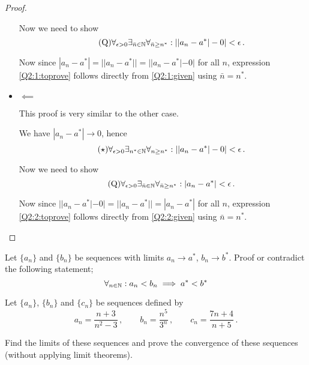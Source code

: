 \documentclass[week=2]{homework}
\begin{document}
\begin{questions}
\begin{proof}
\begin{itemize}
	    		Now we need to show
	    		\begin{equation} \label{Q2:1:toprove} \tag{Q}
		    		\forall_{\epsilon > 0}\exists_{\bar n \in \naturals}\forall_{\bar n \geq n^*}: ||a_n - a^*|-0| < \epsilon\,.
	    		\end{equation}
	    		
	    		Now since $|a_n - a^*| = ||a_n - a^*|| = ||a_n - a^*|-0|$ for all $n$, expression \ref{Q2:1:toprove} follows directly from \ref{Q2:1:given} using $\bar n = n^*$.
	    		
	    		\item $\impliedby$
	    		
	    		This proof is very similar to the other case.
	    		
	    		We have $|a_n-a^*| \to 0$, hence
	    		\begin{equation} \label{Q2:2:given} \tag{$\star$}
	    		\forall_{\epsilon > 0}\exists_{n^* \in \naturals}\forall_{n \geq n^*}: ||a_n - a^*|-0| < \epsilon\,.
	    		\end{equation}
	    		
	    		Now we need to show
	    		\begin{equation} \label{Q2:2:toprove} \tag{Q}
	    		\forall_{\epsilon > 0}\exists_{\bar n \in \naturals}\forall_{\bar n \geq n^*}: |a_n - a^*| < \epsilon\,.
	    		\end{equation}
	    		
	    		Now since $||a_n - a^*|-0| = ||a_n - a^*|| = |a_n - a^*|$ for all $n$, expression \ref{Q2:2:toprove} follows directly from \ref{Q2:2:given} using $\bar n = n^*$.
	    	\end{itemize}
	    \end{proof}
    
	    \question
	    Let $\{a_n\}$ and $\{b_n\}$ be sequences with limits $a_n \to a^*$, $b_n \to b^*$.
	    Proof or contradict the following statement;
	    \[
		    \forall_{n \in \mathbb{N}}: a_n < b_n \implies a^* < b^*
	    \]
	    
	    
	    \question
	    Let $\{a_n\}$, $\{b_n\}$ and $\{c_n\}$ be sequences defined by
	    \[
		    a_n = \frac{n+3}{n^2-3}\,,\qquad b_n = \frac{n^5}{3^n}\,,\qquad c_n = \frac{7n+4}{n+5}\,.
	    \]
	    
	    Find the limits of these sequences and prove the convergence of these sequences (without applying limit theorems).
	    \begin{parts}
	    	\part
	    	
	    	\part 
	    	
	    	\part
	    \end{parts}
     \end{questions}
\end{document}
